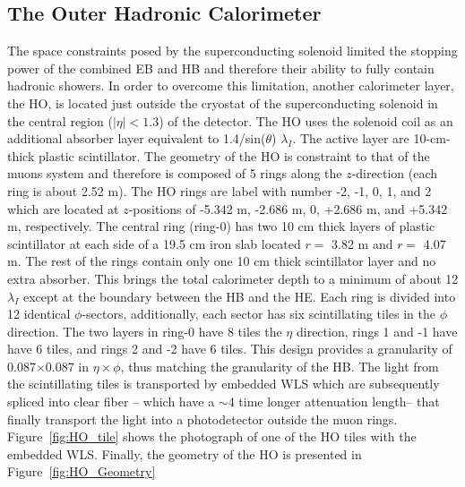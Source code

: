 \subsection{The Outer Hadronic Calorimeter}
The space constraints posed by the superconducting solenoid limited
the stopping power of the combined EB and HB and therefore their
ability to fully contain hadronic showers. In order to overcome this
limitation, another calorimeter layer, the HO, is located just outside the
cryostat of the superconducting solenoid in the central region
($|\eta| < 1.3$) of the detector. The HO uses the solenoid coil as an
additional absorber layer equivalent to 1.4/sin($\theta$)
$\lambda_{I}$. The active layer are 10-cm-thick plastic
scintillator. The geometry of the HO is constraint to that of the
muons system and therefore is composed of 5 rings along the
$z$-direction (each ring is about 2.52 m). The HO rings are label with
number -2, -1, 0, 1, and 2 which are located at $z$-positions of
-5.342 m, -2.686 m, 0, +2.686 m, and +5.342 m, respectively. The
central ring (ring-0) has two 10 cm thick layers of plastic
scintillator at each side of a 19.5 cm iron slab located $r =$ 3.82 m
and  $r =$ 4.07 m. The rest of the rings contain only one 10 cm thick
scintillator layer and no extra absorber. This brings the total
calorimeter depth to a minimum of about 12 $\lambda_{I}$ except at the
boundary between the HB and the HE. Each ring is divided into 12
identical $\phi$-sectors, additionally, each sector has six scintillating tiles in
the $\phi$ direction. The two layers in ring-0 have 8 tiles the $\eta$ direction, rings 1
and -1 have have 6 tiles, and rings 2 and -2 have 6 tiles. This design
provides a granularity of 0.087$\times$0.087 in $\eta\times\phi$, thus
matching the granularity of the HB. The light from the scintillating
tiles is transported by embedded WLS which are subsequently spliced
into clear fiber -- which have a $\sim$4 time longer attenuation
length-- that finally transport the light into a photodetector outside
the muon rings. Figure~\ref{fig:HO_tile} shows the photograph of one
of the HO tiles with the embedded WLS. Finally, the geometry of the HO
is presented in Figure~\ref{fig:HO_Geometry}

